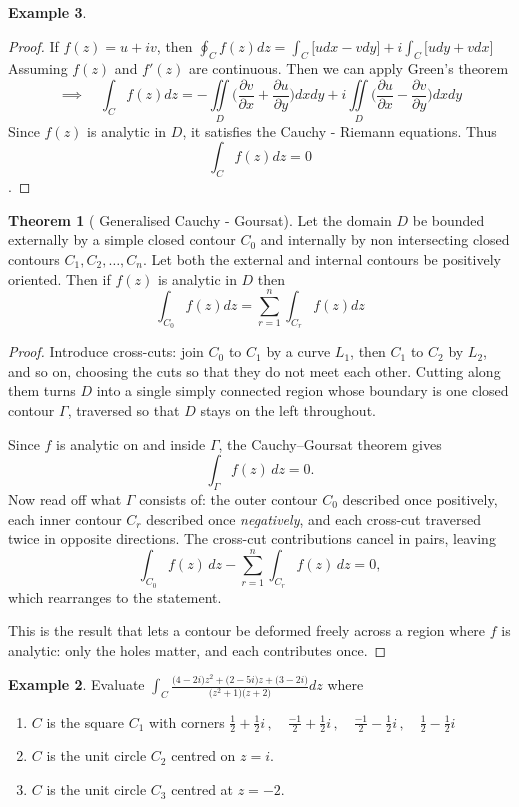 \documentclass[11pt,a4paper]{article}
\theoremstyle{definition}
\newtheorem{thm}{Theorem}[section]
\newtheorem{example}[thm]{Example}
\begin{document}
\begin{example}
\begin{proof}
If $f(z) = u + iv$, then $\displaystyle{\oint_C f(z) dz = \int_C \Big[ u dx - vdy\Big] + i \int_C \Big[udy + vdx\Big]}$\\
Assuming $f(z)$ and $f'(z)$ are continuous. Then we can apply Green's theorem
$$\implies\quad  \int_Cf(z) dz = - \iint\limits_D \Bigg(\frac{\partial v}{\partial x} + \frac{\partial u}{\partial y}\Bigg) dxdy + i \iint\limits_D \Bigg(\frac{\partial u}{\partial x} - \frac{\partial v}{\partial y}\Bigg)dxdy$$
Since $f(z)$ is analytic in $D$, it satisfies the Cauchy - Riemann equations. Thus $$\int_C f(z) dz = 0$$.
\end{proof}

\begin{thm}[ Generalised Cauchy - Goursat]
Let the domain $D$ be bounded externally by a simple closed contour $C_0$ and internally by non intersecting closed contours $C_1, C_2, \ldots,  C_n$. Let both the external and internal contours be positively oriented. Then if $f(z)$ is analytic in $D$ then $$ \int_{C_0} f(z)dz = \sum^n_{r = 1} \int_{C_r}f(z)dz$$
\end{thm}

\begin{proof}
Introduce cross-cuts: join $C_0$ to $C_1$ by a curve $L_1$, then $C_1$ to
$C_2$ by $L_2$, and so on, choosing the cuts so that they do not meet each
other. Cutting along them turns $D$ into a single simply connected region whose
boundary is one closed contour $\Gamma$, traversed so that $D$ stays on the
left throughout.

Since $f$ is analytic on and inside $\Gamma$, the Cauchy--Goursat theorem gives
$$\int_{\Gamma}f(z)\,dz=0 .$$
Now read off what $\Gamma$ consists of: the outer contour $C_0$ described once
positively, each inner contour $C_r$ described once \emph{negatively}, and each
cross-cut traversed twice in opposite directions. The cross-cut contributions
cancel in pairs, leaving
$$\int_{C_0}f(z)\,dz-\sum_{r=1}^{n}\int_{C_r}f(z)\,dz=0 ,$$
which rearranges to the statement.

This is the result that lets a contour be deformed freely across a region where
$f$ is analytic: only the holes matter, and each contributes once.
\end{proof}

\begin{example}
Evaluate $\displaystyle{\int_C \frac{\big(4 - 2i\big) z^2 + \big(2 - 5i\big) z + \big(3 - 2i\big)}{\big(z^2 + 1\big)\big(z + 2\big)}dz}$  where
\begin{enumerate}
\item $C$ is the square $C_1$ with corners $\frac{1}{2}+ \frac{1}{2}i\,, \quad  \frac{-1}{2}+ \frac{1}{2}i\,, \quad  \frac{-1}{2} - \frac{1}{2}i\,, \quad  \frac{1}{2}-\frac{1}{2}i$
\item $C$ is the unit circle $C_2$ centred on $z = i$.
\item $C$ is the unit circle $C_3$ centred at $z = -2$.\\\\
\end{enumerate}






\end{example}
\end{example}
\end{document}
